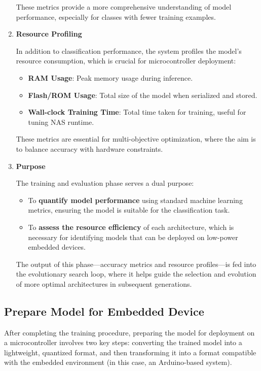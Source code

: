 \begin{enumerate}
These metrics provide a more comprehensive understanding of model performance, especially for classes with fewer training examples.

\item \textbf{Resource Profiling}

In addition to classification performance, the system profiles the model’s resource consumption, which is crucial for microcontroller deployment:
\begin{itemize}
    \item \textbf{RAM Usage}: Peak memory usage during inference.
    \item \textbf{Flash/ROM Usage}: Total size of the model when serialized and stored.
    \item \textbf{Wall-clock Training Time}: Total time taken for training, useful for tuning NAS runtime.
\end{itemize}

These metrics are essential for multi-objective optimization, where the aim is to balance accuracy with hardware constraints.
\item \textbf{Purpose}

The training and evaluation phase serves a dual purpose:
\begin{itemize}
    \item To \textbf{quantify model performance} using standard machine learning metrics, ensuring the model is suitable for the classification task.
    \item To\textbf{ assess the resource efficiency }of each architecture, which is necessary for identifying models that can be deployed on low-power embedded devices.
\end{itemize}

The output of this phase—accuracy metrics and resource profiles—is fed into the evolutionary search loop, where it helps guide the selection and evolution of more optimal architectures in subsequent generations.


    
\end{enumerate}


\subsection{Prepare Model for Embedded Device}

After completing the training procedure, preparing the model for deployment on a microcontroller involves two key steps: converting the trained model into a lightweight, quantized format, and then transforming it into a format compatible with the embedded environment (in this case, an Arduino-based system).

